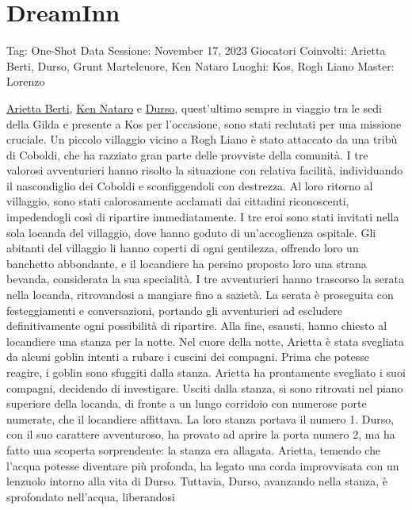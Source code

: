 \section{DreamInn}\label{dreaminn}

Tag: One-Shot Data Sessione: November 17, 2023 Giocatori Coinvolti:
Arietta Berti, Durso, Grunt Martelcuore, Ken Nataro Luoghi: Kos, Rogh
Liano Master: Lorenzo

\href{Arietta\%20Berti\%20adce52afef5f46068374483fcdda54c9.md}{Arietta
Berti}, \href{Ken\%20Nataro\%20b2efe30ba9fd49d2a77e104631b0d916.md}{Ken
Nataro} e \href{Durso\%201300f1f2704341b8af557e877374018c.md}{Durso},
quest'ultimo sempre in viaggio tra le sedi della Gilda e presente a Kos
per l'occasione, sono stati reclutati per una missione cruciale. Un
piccolo villaggio vicino a Rogh Liano è stato attaccato da una tribù di
Coboldi, che ha razziato gran parte delle provviste della comunità. I
tre valorosi avventurieri hanno risolto la situazione con relativa
facilità, individuando il nascondiglio dei Coboldi e sconfiggendoli con
destrezza. Al loro ritorno al villaggio, sono stati calorosamente
acclamati dai cittadini riconoscenti, impedendogli così di ripartire
immediatamente. I tre eroi sono stati invitati nella sola locanda del
villaggio, dove hanno goduto di un'accoglienza ospitale. Gli abitanti
del villaggio li hanno coperti di ogni gentilezza, offrendo loro un
banchetto abbondante, e il locandiere ha persino proposto loro una
strana bevanda, considerata la sua specialità. I tre avventurieri hanno
trascorso la serata nella locanda, ritrovandosi a mangiare fino a
sazietà. La serata è proseguita con festeggiamenti e conversazioni,
portando gli avventurieri ad escludere definitivamente ogni possibilità
di ripartire. Alla fine, esausti, hanno chiesto al locandiere una stanza
per la notte. Nel cuore della notte, Arietta è stata svegliata da alcuni
goblin intenti a rubare i cuscini dei compagni. Prima che potesse
reagire, i goblin sono sfuggiti dalla stanza. Arietta ha prontamente
svegliato i suoi compagni, decidendo di investigare. Usciti dalla
stanza, si sono ritrovati nel piano superiore della locanda, di fronte a
un lungo corridoio con numerose porte numerate, che il locandiere
affittava. La loro stanza portava il numero 1. Durso, con il suo
carattere avventuroso, ha provato ad aprire la porta numero 2, ma ha
fatto una scoperta sorprendente: la stanza era allagata. Arietta,
temendo che l'acqua potesse diventare più profonda, ha legato una corda
improvvisata con un lenzuolo intorno alla vita di Durso. Tuttavia,
Durso, avanzando nella stanza, è sprofondato nell'acqua, liberandosi
